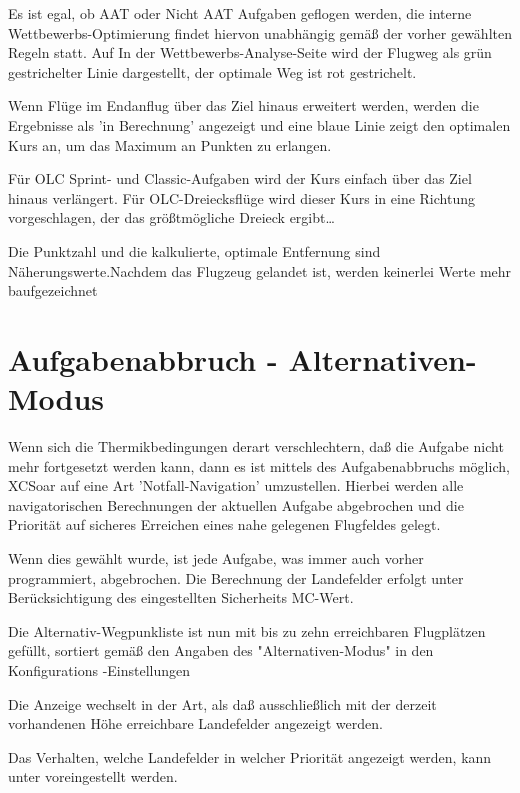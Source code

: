 Es ist egal, ob AAT oder Nicht AAT Aufgaben geflogen werden, die interne Wettbewerbs-Optimierung findet hiervon unabhängig gemäß der vorher gewählten Regeln statt.  Auf In der Wettbewerbs-Analyse-Seite wird der Flugweg als grün gestrichelter Linie dargestellt, der optimale Weg ist rot gestrichelt.

Wenn Flüge im Endanflug über das Ziel hinaus erweitert werden, werden die Ergebnisse als 'in Berechnung' angezeigt und eine blaue Linie zeigt den optimalen Kurs an, um das Maximum an Punkten zu erlangen.

Für OLC Sprint- und Classic-Aufgaben wird der Kurs einfach über das Ziel hinaus verlängert.  Für OLC-Dreiecksflüge wird dieser Kurs in eine Richtung vorgeschlagen, der das größtmögliche Dreieck ergibt\dots

Die Punktzahl und die kalkulierte, optimale Entfernung sind Näherungswerte.Nachdem das Flugzeug gelandet ist, werden keinerlei Werte mehr baufgezeichnet

\section{Aufgabenabbruch - Alternativen-Modus}\label{sec:taskabort}

Wenn sich die Thermikbedingungen derart verschlechtern, daß die Aufgabe nicht mehr fortgesetzt werden kann,
dann es ist mittels des Aufgabenabbruchs möglich, \textsf{XCSoar} auf eine Art 'Notfall-Navigation' umzustellen.
Hierbei werden alle navigatorischen Berechnungen der aktuellen Aufgabe abgebrochen und die Priorität auf sicheres Erreichen eines nahe gelegenen Flugfeldes gelegt.

Wenn dies gewählt wurde,  ist jede Aufgabe, was immer auch vorher programmiert, abgebrochen.
Die Berechnung der Landefelder erfolgt unter Berücksichtigung des eingestellten Sicherheits MC-Wert.

 Die Alternativ-Wegpunkliste ist nun mit bis zu zehn erreichbaren Flugplätzen gefüllt, sortiert gemäß den Angaben des  "Alternativen-Modus" in den Konfigurations -Einstellungen

Die Anzeige wechselt in der Art, als daß ausschließlich mit  der derzeit vorhandenen Höhe erreichbare
Landefelder angezeigt werden.

Das Verhalten, welche Landefelder in welcher Priorität angezeigt werden, kann  unter  voreingestellt werden.


